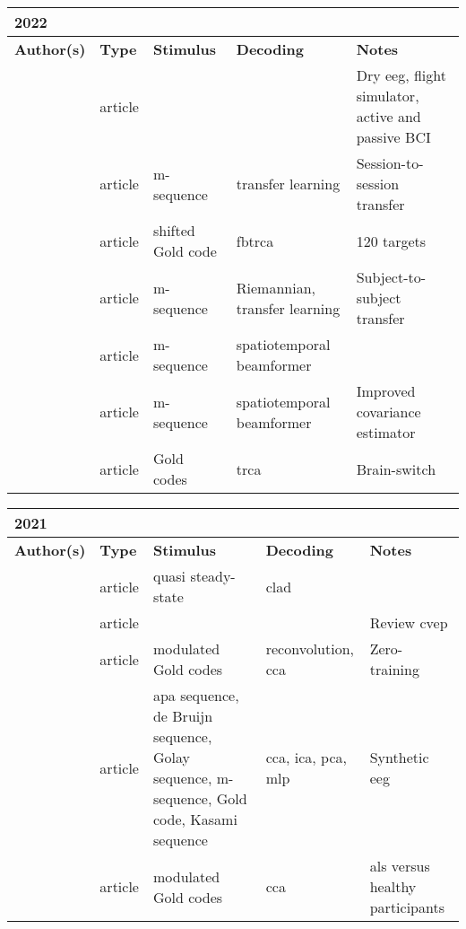 \documentclass[a4paper,landscape]{article}
\begin{document}
\begin{table}[H]
	\begin{tabular}{p{5cm}p{2cm}p{5cm}p{5cm}p{6.5cm}}
		\textbf{2022} & & & & \\
		\toprule
		\textbf{Author(s)} & \textbf{Type} & \textbf{Stimulus} & \textbf{Decoding} & \textbf{Notes} \\
		\midrule
		\citeauthor{dehais2022} & article & & & Dry \acrshort{eeg}, flight simulator, active and passive BCI \\
		\citeauthor{stawicki2022} & article & m-sequence & transfer learning & Session-to-session transfer \\
		\citeauthor{sun2022} & article & shifted Gold code & \acrshort{fbtrca} & 120 targets \\
		\citeauthor{ying2022} & article & m-sequence & Riemannian, transfer learning & Subject-to-subject transfer \\
		\citeauthor{zarei2022a} & article & m-sequence & spatiotemporal beamformer & \\
		\citeauthor{zarei2022b} & article & m-sequence & spatiotemporal beamformer & Improved covariance estimator \\
		\citeauthor{zheng2022} & article & Gold codes & \acrshort{trca} & Brain-switch \\
		\bottomrule
	\end{tabular}
\end{table}

\begin{table}[H]
	\begin{tabular}{p{5cm}p{2cm}p{5cm}p{5cm}p{6.5cm}}
		\textbf{2021} & & & & \\
		\toprule
		\textbf{Author(s)} & \textbf{Type} & \textbf{Stimulus} & \textbf{Decoding} & \textbf{Notes} \\
		\midrule
		\citeauthor{kaya2021} & article & quasi steady-state & \acrshort{clad} & \\
		\citeauthor{martinez2021} & article & & & Review \acrshort{cvep} \\
		\citeauthor{thielen2021} & article & modulated Gold codes & reconvolution, \acrshort{cca} & Zero-training \\
		\citeauthor{torres2021} & article & \acrshort{apa} sequence, de Bruijn sequence, Golay sequence, m-sequence, Gold code, Kasami sequence & \acrshort{cca}, \acrshort{ica}, \acrshort{pca}, \acrshort{mlp}  & Synthetic \acrshort{eeg} \\
		\citeauthor{verbaarschot2021} & article & modulated Gold codes & \acrshort{cca} & \acrshort{als} versus healthy participants \\
		\bottomrule
	\end{tabular}
\end{table}
\end{document}
